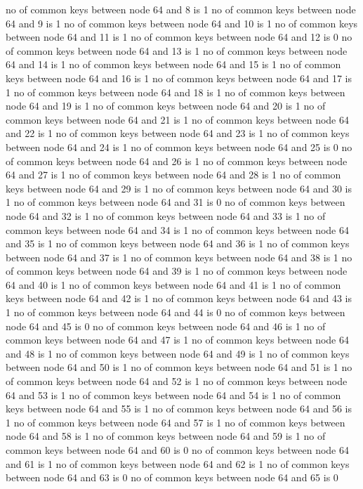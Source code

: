 no of common keys between node 64 and 8 is 1
no of common keys between node 64 and 9 is 1
no of common keys between node 64 and 10 is 1
no of common keys between node 64 and 11 is 1
no of common keys between node 64 and 12 is 0
no of common keys between node 64 and 13 is 1
no of common keys between node 64 and 14 is 1
no of common keys between node 64 and 15 is 1
no of common keys between node 64 and 16 is 1
no of common keys between node 64 and 17 is 1
no of common keys between node 64 and 18 is 1
no of common keys between node 64 and 19 is 1
no of common keys between node 64 and 20 is 1
no of common keys between node 64 and 21 is 1
no of common keys between node 64 and 22 is 1
no of common keys between node 64 and 23 is 1
no of common keys between node 64 and 24 is 1
no of common keys between node 64 and 25 is 0
no of common keys between node 64 and 26 is 1
no of common keys between node 64 and 27 is 1
no of common keys between node 64 and 28 is 1
no of common keys between node 64 and 29 is 1
no of common keys between node 64 and 30 is 1
no of common keys between node 64 and 31 is 0
no of common keys between node 64 and 32 is 1
no of common keys between node 64 and 33 is 1
no of common keys between node 64 and 34 is 1
no of common keys between node 64 and 35 is 1
no of common keys between node 64 and 36 is 1
no of common keys between node 64 and 37 is 1
no of common keys between node 64 and 38 is 1
no of common keys between node 64 and 39 is 1
no of common keys between node 64 and 40 is 1
no of common keys between node 64 and 41 is 1
no of common keys between node 64 and 42 is 1
no of common keys between node 64 and 43 is 1
no of common keys between node 64 and 44 is 0
no of common keys between node 64 and 45 is 0
no of common keys between node 64 and 46 is 1
no of common keys between node 64 and 47 is 1
no of common keys between node 64 and 48 is 1
no of common keys between node 64 and 49 is 1
no of common keys between node 64 and 50 is 1
no of common keys between node 64 and 51 is 1
no of common keys between node 64 and 52 is 1
no of common keys between node 64 and 53 is 1
no of common keys between node 64 and 54 is 1
no of common keys between node 64 and 55 is 1
no of common keys between node 64 and 56 is 1
no of common keys between node 64 and 57 is 1
no of common keys between node 64 and 58 is 1
no of common keys between node 64 and 59 is 1
no of common keys between node 64 and 60 is 0
no of common keys between node 64 and 61 is 1
no of common keys between node 64 and 62 is 1
no of common keys between node 64 and 63 is 0
no of common keys between node 64 and 65 is 0
